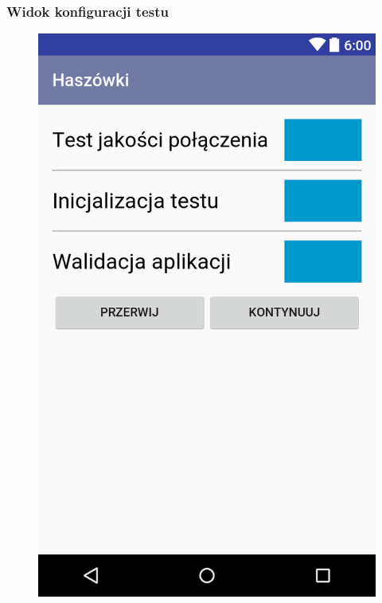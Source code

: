 \documentclass{beamer}
\begin{document}
  \begin{frame}
	\frametitle{Widok konfiguracji testu}
	\begin{center}
		\begin{figure}[ht]
			\centering
			\includegraphics[scale=0.15]{layout-2016-11-29-223634.png}
		\end{figure}
	\end{center}
  \end{frame}
\end{document}
